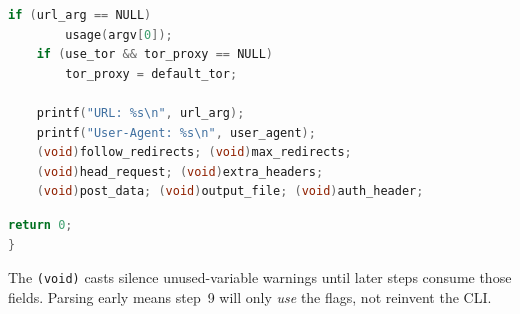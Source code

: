 \begin{lstlisting}[style=newcode,language=C,firstnumber=last]
    if (url_arg == NULL)
        usage(argv[0]);
    if (use_tor && tor_proxy == NULL)
        tor_proxy = default_tor;

    printf("URL: %s\n", url_arg);
    printf("User-Agent: %s\n", user_agent);
    (void)follow_redirects; (void)max_redirects;
    (void)head_request; (void)extra_headers;
    (void)post_data; (void)output_file; (void)auth_header;
\end{lstlisting}
\begin{lstlisting}[style=oldcode,language=C,firstnumber=last]
    return 0;
}
\end{lstlisting}
\FullSourceStop

The \texttt{(void)} casts silence unused-variable warnings until later steps
consume those fields. Parsing early means step~9 will only \emph{use} the
flags, not reinvent the CLI.
